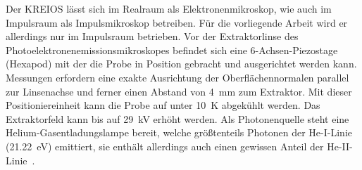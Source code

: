         Der KREIOS lässt sich im Realraum als Elektronenmikroskop, wie auch im Impulsraum als Impulsmikroskop betreiben.
        Für die vorliegende Arbeit wird er allerdings nur im Impulsraum betrieben.
        Vor der Extraktorlinse des Photoelektronenemissionsmikroskopes befindet sich eine 6-Achsen-Piezostage (Hexapod) mit der die Probe in Position gebracht und ausgerichtet werden kann.
        Messungen erfordern eine exakte Ausrichtung der Oberflächennormalen parallel zur Linsenachse und ferner einen Abstand von \SI{4}{\milli\meter} zum Extraktor.
        Mit dieser Positioniereinheit kann die Probe auf unter \SI{10}{\kelvin} abgekühlt werden.
        Das Extraktorfeld kann bis auf \SI{29}{\kilo\volt} erhöht werden.
        Als Photonenquelle steht eine Helium-Gasentladungslampe bereit, welche größtenteils Photonen der He-I-Linie (\SI{21.22}{\electronvolt}) emittiert, sie enthält allerdings auch einen gewissen Anteil der He-II-Linie~\cite{UVS}.
